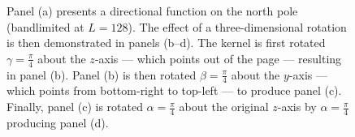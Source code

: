 \begin{figure}[htpb]
	\caption[
		A demonstration of the three-dimensional rotation
	]{
		Panel (a) presents a directional function on the north pole (bandlimited at \(L=128\)).
		The effect of a three-dimensional rotation is then demonstrated in panels (b--d).
		The kernel is first rotated \(\gamma=\frac{\pi}{4}\) about the \(z\)-axis --- which points out of the page --- resulting in panel (b).
		Panel (b) is then rotated \(\beta=\frac{\pi}{4}\) about the \(y\)-axis --- which points from bottom-right to top-left --- to produce panel (c).
		Finally, panel (c) is rotated \(\alpha=\frac{\pi}{4}\) about the original \(z\)-axis by \(\alpha=\frac{\pi}{4}\) producing panel (d).
	}\label{fig:chapter2_rotation_sphere}
\end{figure}

